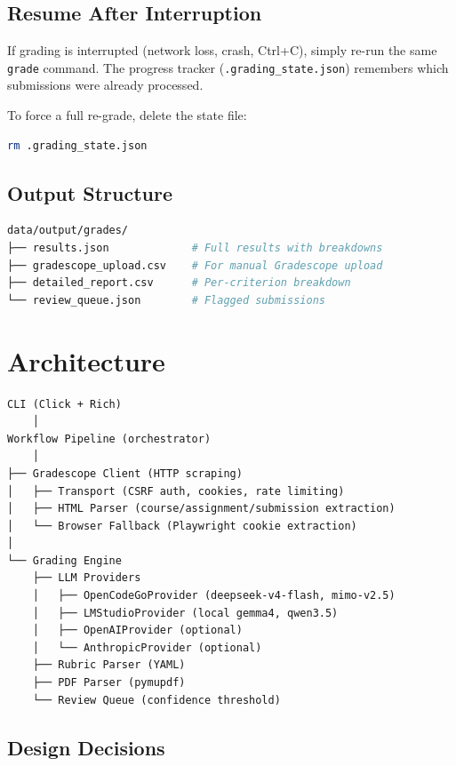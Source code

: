 \documentclass[11pt,a4paper]{article}
\begin{document}
\subsection{Resume After Interruption}

If grading is interrupted (network loss, crash, Ctrl+C), simply re-run the same \texttt{grade} command. The progress tracker (\texttt{.grading\_state.json}) remembers which submissions were already processed.

To force a full re-grade, delete the state file:

\begin{lstlisting}[language=bash]
rm .grading_state.json
\end{lstlisting}

\subsection{Output Structure}

\begin{lstlisting}[language=bash]
data/output/grades/
├── results.json             # Full results with breakdowns
├── gradescope_upload.csv    # For manual Gradescope upload
├── detailed_report.csv      # Per-criterion breakdown
└── review_queue.json        # Flagged submissions
\end{lstlisting}

\section{Architecture}

\begin{verbatim}
CLI (Click + Rich)
    │
Workflow Pipeline (orchestrator)
    │
├── Gradescope Client (HTTP scraping)
│   ├── Transport (CSRF auth, cookies, rate limiting)
│   ├── HTML Parser (course/assignment/submission extraction)
│   └── Browser Fallback (Playwright cookie extraction)
│
└── Grading Engine
    ├── LLM Providers
    │   ├── OpenCodeGoProvider (deepseek-v4-flash, mimo-v2.5)
    │   ├── LMStudioProvider (local gemma4, qwen3.5)
    │   ├── OpenAIProvider (optional)
    │   └── AnthropicProvider (optional)
    ├── Rubric Parser (YAML)
    ├── PDF Parser (pymupdf)
    └── Review Queue (confidence threshold)
\end{verbatim}

\subsection{Design Decisions}
\end{document}
